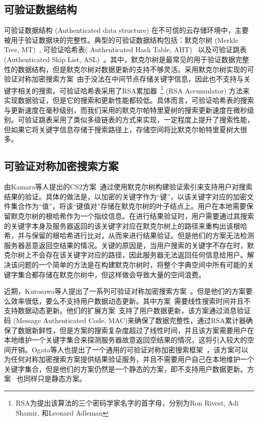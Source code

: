 \subsection{可验证数据结构}
可验证数据结构 (Authenticated data structure) 在不可信的云存储环境中，主要被用于验证数据块的完整性。典型的可验证数据结构包括：默克尔树 (Merkle Tree, MT)~\cite{merkle1987digital}, 可验证哈希表( Authenticated Hash Table, AHT)~\cite{papamanthou2008authenticated} 以及可验证跳表 (Authenticated Skip List, ASL)~\cite{pugh1990skip,goodrich2001implementation}。其中，默克尔树是最常见的用于验证数据完整性的数据结构，但是默克尔树对数据更新的支持不够灵活。采用默克尔树实现的可验证对称加密搜索方案~\cite{kamara2011cs2}由于没法在中间节点存储关键字信息，因此也不支持与关键字相关的搜索。可验证哈希表采用了RSA累加器~\footnote{RSA为提出该算法的三个密码学家名字的首字母，分别为Ron Rivest, Adi Shamir, 和Leonard Adleman} (RSA Accumulator) 方法来实现数据验证，但是它的搜索和更新性能都较低。具体而言，可验证哈希表的搜索与更新速度在毫秒级别，而我们采用的默克尔帕特里夏树的搜索更新速度在微秒级别。可验证跳表采用了类似多级链表的方式来实现，一定程度上提升了搜索性能，但如果它将关键字信息存储于搜索路径上，存储空间将比默克尔帕特里夏树大很多。


\subsection{可验证对称加密搜索方案}
由Kamara等人提出的CS2方案~\cite{kamara2011cs2}通过使用默克尔树构建验证索引来支持用户对搜索结果的验证。具体的做法是，以加密的关键字作为“键”，以该关键字对应的加密文件集合作为“值”，将该“键值对”存储在默克尔树的叶子结点上。用户在本地需要保留默克尔树的根哈希作为一个指纹信息。在进行结果验证时，用户需要通过其搜索的关键字本身及服务器返回的该关键字对应在默克尔树上的路径来重构出该根哈希，并与保留的根哈希进行比对，从而来进行结果验证。但是他们的方案无法检测服务器恶意返回空结果的情况。关键的原因是，当用户搜索的关键字不存在时，默克尔树上不会存在该关键字对应的路径，因此服务器无法返回任何信息给用户。解决该问题的一个简单的方法是在构建默克尔树时，将整个字典空间中所有可能的关键字集合都存储在默克尔树中，但这样做会导致大量的空间浪费。

近期，Kurosawa等人提出了一系列可验证对称加密搜索方案~\cite{kurosawa2012uc,kurosawa2013update,ogataefficient}。但是他们的方案要么效率很低，要么不支持用户数据动态更新。其中方案~\cite{kurosawa2012uc}需要线性搜索时间并且不支持数据动态更新。他们的扩展方案~\cite{kurosawa2013update}支持了用户数据更新，该方案通过消息验证码 (Message Authenticated Code, MAC)来确保了数据完整性，通过RSA累计器确保了数据新鲜性，但是方案的搜索复杂度超过了线性时间，并且该方案需要用户在本地维护一个关键字集合来探测服务器故意返回空结果的情况，这将引入较大的空间开销。Ogata等人也提出了一个通用的可验证对称加密搜索框架~\cite{ogataefficient}，该方案可以为任何对称加密搜索方案提供结果验证服务，并且不需要用户自己在本地维护一个关键字集合，但是他们的方案仍然是一个静态的方案，即不支持用户数据更新。方案~\cite{chai2012verifiable} \cite{cheng2015verifiable}也同样只是静态方案。

